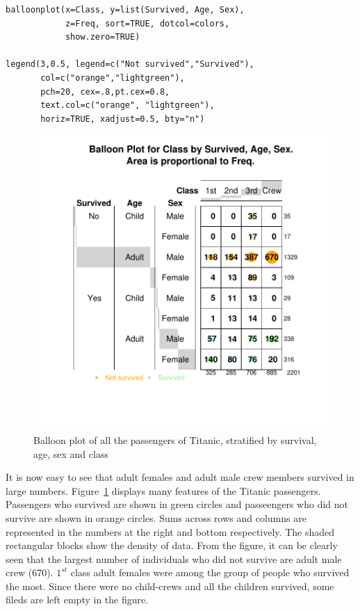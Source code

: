 \documentclass[a4paper]{report}
\begin{document}
\begin{article}
{\begin{verbatim}
balloonplot(x=Class, y=list(Survived, Age, Sex),
            z=Freq, sort=TRUE, dotcol=colors,
            show.zero=TRUE)

legend(3,0.5, legend=c("Not survived","Survived"),
       col=c("orange","lightgreen"),
       pch=20, cex=.8,pt.cex=0.8,
       text.col=c("orange", "lightgreen"),
       horiz=TRUE, xadjust=0.5, bty="n")
\end{verbatim}
 }

\begin{figure}
\includegraphics[width=\textwidth]{Figure4.pdf}
\caption{\label{figure:Figure4}
Balloon plot of all the passengers of Titanic, stratified by survival, age, sex
and class}
\end{figure}

It is now easy to see that adult females and adult male crew members
survived in large numbers. Figure~\ref{figure:Figure4} displays many
features of the Titanic passengers. Passengers who survived are
shown in green circles and passeengers who did not survive are shown
in orange circles. Sums across rows and columns are represented in
the numbers at the right and bottom respectively.  The shaded
rectangular blocks show the density of data.  From the figure, it
can be clearly seen that the largest number of individuals who did
not survive are adult male crew (670). $1^{st}$ class adult females
were among the group of people who survived the most. Since there
were no child-crews and all the children survived, some fileds are
left empty in the figure. 






\end{article}
\end{document}
